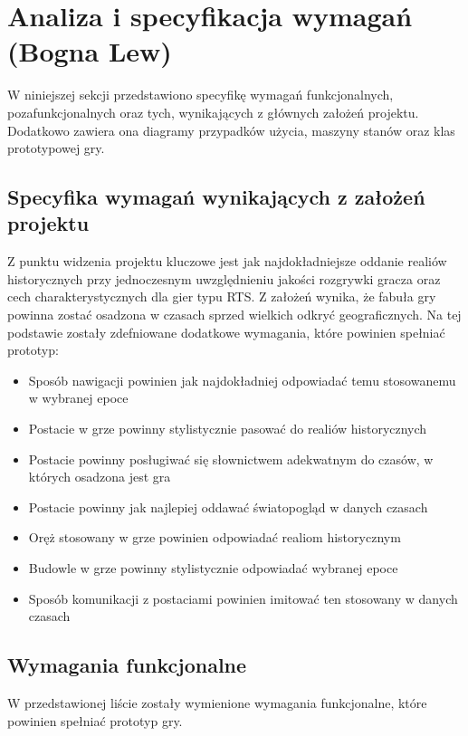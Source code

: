 \section{Analiza i specyfikacja wymagań (Bogna Lew)}
W niniejszej sekcji przedstawiono specyfikę wymagań funkcjonalnych, pozafunkcjonalnych oraz tych, wynikających z
głównych założeń projektu. Dodatkowo zawiera ona diagramy przypadków użycia, maszyny stanów oraz klas prototypowej gry.

\subsection{Specyfika wymagań wynikających z założeń projektu}
Z punktu widzenia projektu kluczowe jest jak najdokładniejsze oddanie realiów historycznych przy jednoczesnym
uwzględnieniu jakości rozgrywki gracza oraz cech charakterystycznych dla gier typu RTS. Z założeń wynika, że fabuła
gry powinna zostać osadzona w czasach sprzed wielkich odkryć geograficznych. Na tej podstawie zostały zdefniowane
dodatkowe wymagania, które powinien spełniać prototyp:
\begin{itemize}
  \item Sposób nawigacji powinien jak najdokładniej odpowiadać temu stosowanemu w wybranej epoce
  \item Postacie w grze powinny stylistycznie pasować do realiów historycznych
  \item Postacie powinny posługiwać się słownictwem adekwatnym do czasów, w których osadzona jest gra
  \item Postacie powinny jak najlepiej oddawać światopogląd w danych czasach
  \item Oręż stosowany w grze powinien odpowiadać realiom historycznym
  \item Budowle w grze powinny stylistycznie odpowiadać wybranej epoce
  \item Sposób komunikacji z postaciami powinien imitować ten stosowany w danych czasach
\end{itemize}

\subsection{Wymagania funkcjonalne}\label{ss:fun}
W przedstawionej liście zostały wymienione wymagania funkcjonalne, które powinien spełniać prototyp gry.

